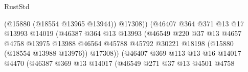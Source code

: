 \begin{lexlean}{RustStd}
\begin{coremodule}
                                                  (@15880 (@18554 @13965 @13944))
                                                  @17308))
                                              (@46407
                                                @364
                                                @371
                                                @13
                                                @17
                                                @13993
                                                @14019
                                                (@46387
                                                  @364
                                                  @13
                                                  @13993
                                                  (@46549
                                                    @220
                                                    @37
                                                    @13
                                                    @4657
                                                    @4758
                                                    @13975
                                                    @13988
                                                    @46564
                                                    @45788
                                                    @45792
                                                    @30221
                                                    @18198
                                                    (@15880 (@18554 @13988 @13976))
                                                    @17308))
                                                (@46407
                                                  @369
                                                  @113
                                                  @13
                                                  @16
                                                  @14017
                                                  @4470
                                                  (@46387
                                                    @369
                                                    @13
                                                    @14017
                                                    (@46549
                                                      @271
                                                      @37
                                                      @13
                                                      @4501
                                                      @4758

\end{coremodule}
\end{lexlean}
